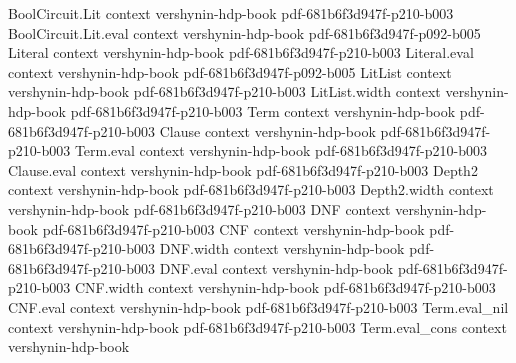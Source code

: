 \begin{theorem}
\leanok
{}
\proofstep
  {BoolCircuit.Lit}
  {context}
  {vershynin-hdp-book}
  {pdf-681b6f3d947f-p210-b003}
\proofstep
  {BoolCircuit.Lit.eval}
  {context}
  {vershynin-hdp-book}
  {pdf-681b6f3d947f-p092-b005}
\proofstep
  {Literal}
  {context}
  {vershynin-hdp-book}
  {pdf-681b6f3d947f-p210-b003}
\proofstep
  {Literal.eval}
  {context}
  {vershynin-hdp-book}
  {pdf-681b6f3d947f-p092-b005}
\proofstep
  {LitList}
  {context}
  {vershynin-hdp-book}
  {pdf-681b6f3d947f-p210-b003}
\proofstep
  {LitList.width}
  {context}
  {vershynin-hdp-book}
  {pdf-681b6f3d947f-p210-b003}
\proofstep
  {Term}
  {context}
  {vershynin-hdp-book}
  {pdf-681b6f3d947f-p210-b003}
\proofstep
  {Clause}
  {context}
  {vershynin-hdp-book}
  {pdf-681b6f3d947f-p210-b003}
\proofstep
  {Term.eval}
  {context}
  {vershynin-hdp-book}
  {pdf-681b6f3d947f-p210-b003}
\proofstep
  {Clause.eval}
  {context}
  {vershynin-hdp-book}
  {pdf-681b6f3d947f-p210-b003}
\proofstep
  {Depth2}
  {context}
  {vershynin-hdp-book}
  {pdf-681b6f3d947f-p210-b003}
\proofstep
  {Depth2.width}
  {context}
  {vershynin-hdp-book}
  {pdf-681b6f3d947f-p210-b003}
\proofstep
  {DNF}
  {context}
  {vershynin-hdp-book}
  {pdf-681b6f3d947f-p210-b003}
\proofstep
  {CNF}
  {context}
  {vershynin-hdp-book}
  {pdf-681b6f3d947f-p210-b003}
\proofstep
  {DNF.width}
  {context}
  {vershynin-hdp-book}
  {pdf-681b6f3d947f-p210-b003}
\proofstep
  {DNF.eval}
  {context}
  {vershynin-hdp-book}
  {pdf-681b6f3d947f-p210-b003}
\proofstep
  {CNF.width}
  {context}
  {vershynin-hdp-book}
  {pdf-681b6f3d947f-p210-b003}
\proofstep
  {CNF.eval}
  {context}
  {vershynin-hdp-book}
  {pdf-681b6f3d947f-p210-b003}
\proofstep
  {Term.eval_nil}
  {context}
  {vershynin-hdp-book}
  {pdf-681b6f3d947f-p210-b003}
\proofstep
  {Term.eval_cons}
  {context}
  {vershynin-hdp-book}

\end{theorem}
